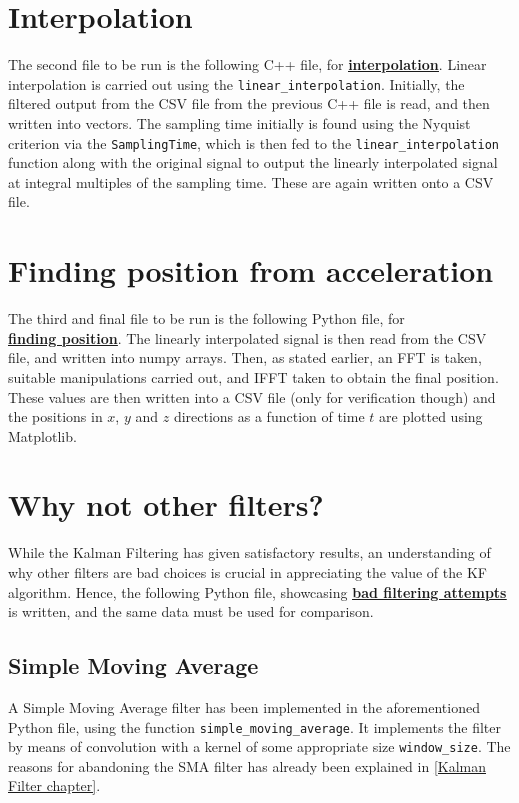 \documentclass[oneside]{book}
\begin{document}
\section{Interpolation}
The second file to be run is the following C++ file, for \href{https://github.com/HarryNyquist/Odometry/blob/main/Codes/2_DataFunctions.cpp}{\textbf{\underline{interpolation}}}. Linear interpolation is carried out using the \verb|linear_interpolation|. Initially, the filtered output from the CSV file from the previous C++ file is read, and then written into vectors. The sampling time initially is found using the Nyquist criterion via the \verb|SamplingTime|, which is then fed to the \verb|linear_interpolation| function along with the original signal to output the linearly interpolated signal at integral multiples of the sampling time. These are again written onto a CSV file. \\
\bigskip
\section{Finding position from acceleration}
The third and final file to be run is the following Python file, for \\
\href{https://github.com/HarryNyquist/Odometry/blob/main/Codes/3_Data_analysis.py}{\textbf{\underline{finding position}}}. The linearly interpolated signal is then read from the CSV file, and written into numpy arrays. Then, as stated earlier, an FFT is taken, suitable manipulations carried out, and IFFT taken to obtain the final position. These values are then written into a CSV file (only for verification though) and the positions in $x$, $y$ and $z$ directions as a function of time $t$ are plotted using Matplotlib.\\
\bigskip
\section{Why not other filters?}
While the Kalman Filtering has given satisfactory results, an understanding of why other filters are bad choices is crucial in appreciating the value of the KF algorithm. Hence, the following Python file, showcasing \href{https://github.com/HarryNyquist/Odometry/blob/main/Odometry_Bad_Tries/Bad_Filter_attempts.py}{\textbf{\underline{bad filtering attempts}}} is written, and the same data must be used for comparison. \\
\subsection{Simple Moving Average}
A Simple Moving Average filter has been implemented in the aforementioned Python file, using the function \verb|simple_moving_average|. It implements the filter by means of convolution with a kernel of some appropriate size \verb|window_size|. The reasons for abandoning the SMA filter has already been explained in \autoref{Kalman Filter chapter}.\\
\end{document}
